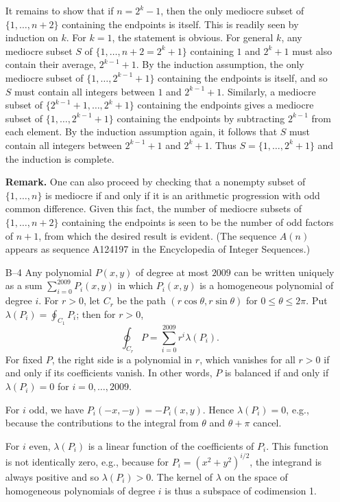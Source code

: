 \documentclass[amssymb,twocolumn,pra,10pt,aps]{revtex4-1}
\begin{document}
\begin{itemize}
It remains to show that if $n=2^k-1$, then the only mediocre subset of
$\{1,\ldots,n+2\}$ containing the endpoints is itself. This is readily
seen by induction on $k$. For $k=1$, the statement is obvious. For
general $k$, any mediocre subset $S$ of $\{1,\ldots,n+2=2^k+1\}$
containing $1$ and $2^k+1$ must also contain their average, $2^{k-1}+1$.
By the induction assumption, the only mediocre subset of
$\{1,\ldots,2^{k-1}+1\}$ containing the endpoints is itself, and so $S$
must contain all integers between $1$ and $2^{k-1}+1$. Similarly, a
mediocre subset of $\{2^{k-1}+1,\ldots,2^k+1\}$ containing the endpoints
gives a mediocre subset of $\{1,\ldots,2^{k-1}+1\}$ containing the
endpoints by subtracting $2^{k-1}$ from each element. By the induction
assumption again, it follows that $S$ must contain all integers between
$2^{k-1}+1$ and $2^k+1$. Thus $S = \{1,\ldots,2^k+1\}$ and the induction
is complete.

\textbf{Remark.} One can also proceed by checking that a nonempty subset of
$\{1,\dots,n\}$ is mediocre if and only if it is an arithmetic progression
with odd common difference. Given this fact, the number of
mediocre subsets of $\{1,\dots,n+2\}$ containing the endpoints is seen to be
the number of odd factors of $n+1$, from which the desired result is evident.
(The sequence $A(n)$ appears as sequence A124197 in the Encyclopedia of Integer Sequences.)

\item[B--4]
Any polynomial $P(x,y)$ of degree at most $2009$ can be written uniquely
as a sum $\sum_{i=0}^{2009} P_i(x,y)$ in which $P_i(x,y)$ is a homogeneous
polynomial of degree $i$.
For $r>0$, let $C_r$ be the path $(r\cos \theta, r\sin \theta)$
for $0 \leq \theta \leq 2\pi$. Put $\lambda(P_i) = \oint_{C_1} P_i$; then
for $r>0$,
\[
\oint_{C_r} P = \sum_{i=0}^{2009} r^i \lambda(P_i).
\]
For fixed $P$, the right side is a polynomial in $r$, which vanishes for
all $r>0$ if and only if its coefficients vanish.
In other words,
$P$ is balanced
if and only if $\lambda(P_i) = 0$ for $i=0,\dots,2009$.

For $i$ odd, we have $P_i(-x,-y) = -P_i(x,y)$.
Hence $\lambda(P_i) = 0$, e.g.,
because the contributions to the integral from
$\theta$ and $\theta + \pi$ cancel.

For $i$ even, $\lambda(P_i)$ is a linear function of the coefficients of
$P_i$. This function is not identically zero, e.g., because for $P_i =
(x^2 + y^2)^{i/2}$, the integrand is always positive and so
$\lambda(P_i) > 0$. The kernel of $\lambda$ on the space of homogeneous
polynomials of degree $i$ is thus a subspace of codimension 1.


\end{itemize}
\end{document}
